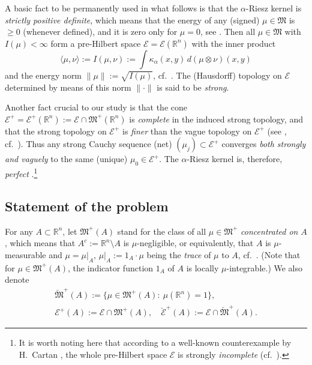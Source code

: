 \documentclass[12pt,a4paper,reqno]{amsart} %
\theoremstyle{lause}
\theoremstyle{maaritelma}
\theoremstyle{lause}
\theoremstyle{maaritelma}
\numberwithin{equation}{section}
\begin{document}
A basic fact to be permanently used in what follows is that the $\alpha$-Riesz kernel is {\it strictly positive definite}, which means that the energy of any (signed) $\mu\in\mathfrak M$ is ${}\geqslant0$ (whenever defined), and it is zero only for $\mu=0$, see \cite[Theorem~1.15]{L}. Then all $\mu\in\mathfrak M$ with $I(\mu)<\infty$ form a pre-Hil\-bert space $\mathcal E=\mathcal E(\mathbb R^n)$ with the inner product
\[\langle\mu,\nu\rangle:=I(\mu,\nu):=\int\kappa_\alpha(x,y)\,d(\mu\otimes\nu)(x,y)\]
and the energy norm $\|\mu\|:=\sqrt{I(\mu)}$, cf.\ \cite[Section~3.1]{F1}. The (Hausdorff) topology on $\mathcal E$ determined by means of this norm $\|\cdot\|$ is said to be {\it strong}.

Another fact crucial to our study is that the cone $\mathcal E^+=\mathcal E^+(\mathbb R^n):=\mathcal E\cap\mathfrak M^+(\mathbb R^n)$ is {\it complete} in the induced strong topology, and that the strong topology on $\mathcal E^+$ is {\it finer} than the vague topology on $\mathcal E^+$ (see \cite{Ca1,D1,De2}, cf.\ \cite[Section~I.4.13]{L}). Thus any strong Cauchy sequence (net) $(\mu_j)\subset\mathcal E^+$ converges {\it both strongly and vaguely} to the same (unique) $\mu_0\in\mathcal E^+$. The $\alpha$-Riesz kernel is, therefore, {\it perfect} \cite[Section~3.3]{F1}.\footnote{It is worth noting here that according to a well-known counterexample by H.~Cartan \cite{Ca1}, the whole pre-Hilbert space $\mathcal E$ is strongly {\it incomplete} (cf.\ \cite[Theorem~1.19]{L}).}

\subsection{Statement of the problem} For any $A\subset\mathbb R^n$, let $\mathfrak M^+(A)$ stand for the class of all $\mu\in\mathfrak M^+$ {\it concentrated on} $A$, which means that $A^c:=\mathbb R^n\setminus A$ is $\mu$-negligible, or equivalently, that $A$ is $\mu$-measurable and $\mu=\mu|_A$, $\mu|_A:=1_A\cdot\mu$ being the {\it trace} of $\mu$ to $A$, cf.\ \cite[Section~V.5.7]{B2}. (Note that for $\mu\in\mathfrak M^+(A)$, the indicator function $1_A$ of $A$ is locally $\mu$-int\-egr\-able.) We also denote
\begin{gather*}
\breve{\mathfrak M}^+(A):=\bigl\{\mu\in\mathfrak M^+(A):\ \mu(\mathbb R^n)=1\bigr\},\\
\mathcal E^+(A):=\mathcal E\cap\mathfrak M^+(A),\quad\breve{\mathcal E}^+(A):=\mathcal E\cap\breve{\mathfrak M}^+(A).
\end{gather*}
\end{document}

